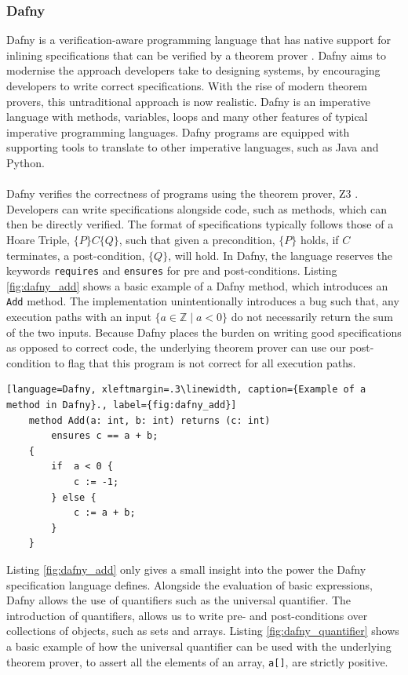 \subsubsection{Dafny}
Dafny is a verification-aware programming language that has native support for inlining specifications that can be verified by a theorem prover \cite{dafny_paper}. Dafny aims to modernise the approach developers take to designing systems, by encouraging developers to write correct specifications. With the rise of modern theorem provers, this untraditional approach is now realistic. Dafny is an imperative language with methods, variables, loops and many other features of typical imperative programming languages. Dafny programs are equipped with supporting tools to translate to other imperative languages, such as Java and Python. 
\\ \\
Dafny verifies the correctness of programs using the theorem prover, Z3 \cite{z3}. Developers can write specifications alongside code, such as methods, which can then be directly verified. The format of specifications typically follows those of a Hoare Triple, $\{P\}C\{Q\}$, such that given a precondition, $\{P\}$ holds, if $C$ terminates, a post-condition, $\{Q\}$, will hold. In Dafny, the language reserves the keywords \texttt{requires} and \texttt{ensures} for pre and post-conditions. Listing \ref{fig:dafny_add} shows a basic example of a Dafny method, which introduces an \texttt{Add} method. The implementation unintentionally introduces a bug such that, any execution paths with an input $\{ a \in \mathbb{Z} \mid a < 0 \}$ do not necessarily return the sum of the two inputs. Because Dafny places the burden on writing good specifications as opposed to correct code, the underlying theorem prover can use our post-condition to flag that this program is not correct for all execution paths.
\begin{lstlisting}[language=Dafny, xleftmargin=.3\linewidth, caption={Example of a method in Dafny}., label={fig:dafny_add}]
    method Add(a: int, b: int) returns (c: int)
        ensures c == a + b;
    {
        if  a < 0 {
            c := -1;
        } else {
            c := a + b;
        }
    }
\end{lstlisting}
Listing \ref{fig:dafny_add} only gives a small insight into the power the Dafny specification language defines. Alongside the evaluation of basic expressions, Dafny allows the use of quantifiers such as the universal quantifier. The introduction of quantifiers, allows us to write pre- and post-conditions over collections of objects, such as sets and arrays. Listing \ref{fig:dafny_quantifier} shows a basic example of how the universal quantifier can be used with the underlying theorem prover, to assert all the elements of an array, \texttt{a[]}, are strictly positive.
